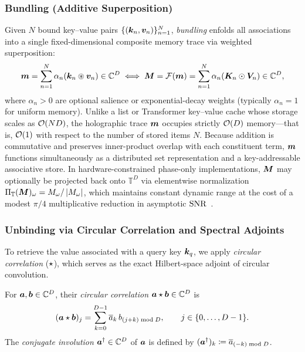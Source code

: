 \subsubsection{Bundling (Additive Superposition)}

Given $N$ bound key--value pairs $\{(\boldsymbol{k}_n, \boldsymbol{v}_n)\}_{n=1}^N$, \emph{bundling} enfolds all associations into a single fixed-dimensional composite memory trace via weighted superposition:
\begin{equation}\label{eq:bundling}
    \boldsymbol{m} = \sum_{n=1}^{N} \alpha_n (\boldsymbol{k}_n \circledast \boldsymbol{v}_n) \in \mathbb{C}^D
    \;\Longleftrightarrow\;
    \boldsymbol{M} = \mathcal{F}(\boldsymbol{m}) = \sum_{n=1}^{N} \alpha_n (\boldsymbol{K}_n \odot \boldsymbol{V}_n) \in \mathbb{C}^D,
\end{equation}
where $\alpha_n > 0$ are optional salience or exponential-decay weights (typically $\alpha_n = 1$ for uniform memory).
Unlike a list or Transformer key--value cache whose storage scales as $\mathcal{O}\!\left(ND\right)$, the holographic trace $\boldsymbol{m}$ occupies strictly $\mathcal{O}\!\left(D\right)$ memory---that is, $\mathcal{O}\!\left(1\right)$ with respect to the number of stored items $N$.
Because addition is commutative and preserves inner-product overlap with each constituent term, $\boldsymbol{m}$ functions simultaneously as a distributed set representation and a key-addressable associative store.
In hardware-constrained phase-only implementations, $\boldsymbol{M}$ may optionally be projected back onto $\mathbb{T}^D$ via elementwise normalization $\Pi_{\mathbb{T}}(\boldsymbol{M})_\omega = M_\omega / \left\lvert M_\omega \right\rvert$, which maintains constant dynamic range at the cost of a modest $\pi/4$ multiplicative reduction in asymptotic $\mathrm{SNR}$~\cite{PLATE_1995_HRR,FRADY_CAPACITY_VSA}.

\subsubsection{Unbinding via Circular Correlation and Spectral Adjoints}

To retrieve the value associated with a query key $\boldsymbol{k}_q$, we apply \emph{circular correlation} ($\star$), which serves as the exact Hilbert-space adjoint of circular convolution.

\begin{definition}\label{def:ccorr}
For $\boldsymbol{a}, \boldsymbol{b} \in \mathbb{C}^D$, their \emph{circular correlation} $\boldsymbol{a} \star \boldsymbol{b} \in \mathbb{C}^D$ is
\begin{equation}\label{eq:ccorr_def}
    (\boldsymbol{a} \star \boldsymbol{b})_j = \sum_{k=0}^{D-1} \overline{a}_k \, b_{(j + k) \bmod D}, \qquad j \in \{0, \dots, D-1\}.
\end{equation}
The \emph{conjugate involution} ${\boldsymbol{a}}^{\dagger} \in \mathbb{C}^D$ of $\boldsymbol{a}$ is defined by $({\boldsymbol{a}}^{\dagger})_k \coloneqq \overline{a}_{(-k) \bmod D}$.
\end{definition}

